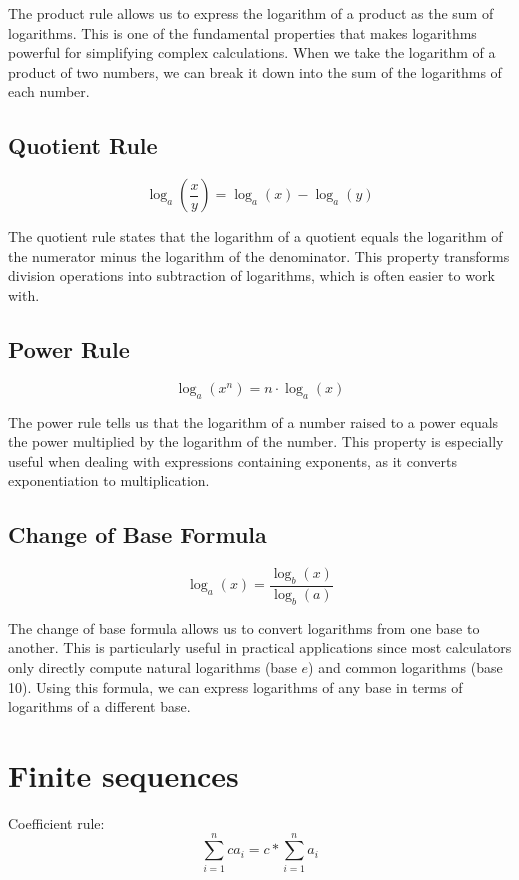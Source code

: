 \documentclass{article}
\begin{document}
The product rule allows us to express the logarithm of a product as the sum of logarithms. This is one of the fundamental properties that makes logarithms powerful for simplifying complex calculations. When we take the logarithm of a product of two numbers, we can break it down into the sum of the logarithms of each number.

\subsection*{Quotient Rule}
\begin{equation}
  \log_a\left(\frac{x}{y}\right) = \log_a(x) - \log_a(y)
\end{equation}

The quotient rule states that the logarithm of a quotient equals the logarithm of the numerator minus the logarithm of the denominator. This property transforms division operations into subtraction of logarithms, which is often easier to work with.

\subsection*{Power Rule}
\begin{equation}
  \log_a(x^n) = n \cdot \log_a(x)
\end{equation}

The power rule tells us that the logarithm of a number raised to a power equals the power multiplied by the logarithm of the number. This property is especially useful when dealing with expressions containing exponents, as it converts exponentiation to multiplication.

\subsection*{Change of Base Formula}
\begin{equation}
  \log_a(x) = \frac{\log_b(x)}{\log_b(a)}
\end{equation}

The change of base formula allows us to convert logarithms from one base to another. This is particularly useful in practical applications since most calculators only directly compute natural logarithms (base $e$) and common logarithms (base 10). Using this formula, we can express logarithms of any base in terms of logarithms of a different base.

\section{Finite sequences}
Coefficient rule:
\begin{equation}
  \sum_{i=1}^{n} ca_i = c * \sum_{i=1}^{n} a_i
\end{equation}
\end{document}
